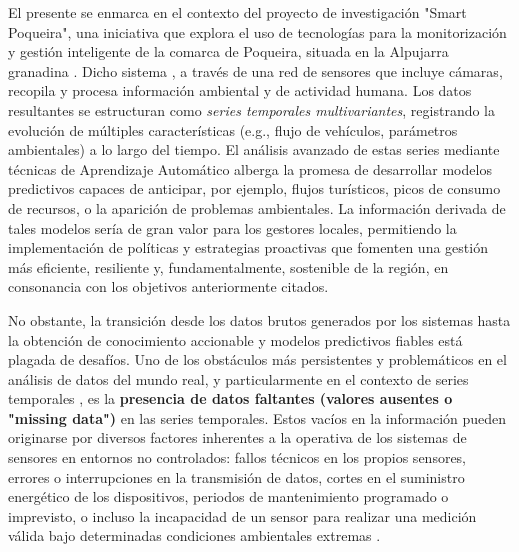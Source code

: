 El presente  se enmarca en el contexto del proyecto de investigación "Smart Poqueira", una iniciativa que explora el uso de tecnologías  para la monitorización y gestión inteligente de la comarca de Poqueira, situada en la Alpujarra granadina \citep{smartpoqueira_project}. Dicho sistema , a través de una red de sensores que incluye cámaras, recopila y procesa información ambiental y de actividad humana. Los datos resultantes se estructuran como \textit{series temporales multivariantes}, registrando la evolución de múltiples características (e.g., flujo de vehículos, parámetros ambientales) a lo largo del tiempo. El análisis avanzado de estas series mediante técnicas de Aprendizaje Automático alberga la promesa de desarrollar modelos predictivos capaces de anticipar, por ejemplo, flujos turísticos, picos de consumo de recursos, o la aparición de problemas ambientales. La información derivada de tales modelos sería de gran valor para los gestores locales, permitiendo la implementación de políticas y estrategias proactivas que fomenten una gestión más eficiente, resiliente y, fundamentalmente, sostenible de la región, en consonancia con los objetivos  anteriormente citados.

No obstante, la transición desde los datos brutos generados por los sistemas  hasta la obtención de conocimiento accionable y modelos predictivos fiables está plagada de desafíos. Uno de los obstáculos más persistentes y problemáticos en el análisis de datos del mundo real, y particularmente en el contexto de series temporales , es la \textbf{presencia de datos faltantes (valores ausentes o "missing data")} en las series temporales. Estos vacíos en la información pueden originarse por diversos factores inherentes a la operativa de los sistemas de sensores en entornos no controlados: fallos técnicos en los propios sensores, errores o interrupciones en la transmisión de datos, cortes en el suministro energético de los dispositivos, periodos de mantenimiento programado o imprevisto, o incluso la incapacidad de un sensor para realizar una medición válida bajo determinadas condiciones ambientales extremas \citep{LittleRubin2002}.


